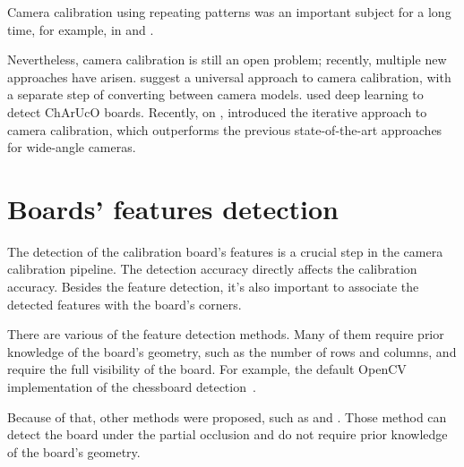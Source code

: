 Camera calibration using repeating patterns was an important subject for a long
time, for example, \cite{schaffalitzkyGeometricGroupingRepeated1998} in
\citeyear{schaffalitzkyGeometricGroupingRepeated1998} and
\cite{zhangFlexibleNewTechnique2000}.


Nevertheless, camera calibration is still an open problem; recently,
multiple new approaches have arisen.
\cite{lochmanBabelCalibUniversalApproach2021} suggest a universal approach
to camera calibration, with a separate step of converting between camera models.
\cite{huDeepChArUcoDark2019} used deep learning to detect ChArUcO boards.
Recently, on ,
\cite{duisterhofTartanCalibIterativeWideAngle2022} introduced the iterative
approach to camera calibration, which outperforms the previous state-of-the-art
approaches for wide-angle cameras.



\section{Boards' features detection}\label{sec:boards_features_detection}

The detection of the calibration board's features is a crucial step in the
camera calibration pipeline. The detection accuracy directly affects the
calibration accuracy. Besides the feature detection, it's also important to
associate the detected features with the board's corners.

There are various of the feature detection methods. Many of them require
prior knowledge of the board's geometry, such as the number of rows and columns,
and require the full visibility of the board. For example, the default OpenCV
implementation of the chessboard detection~\citep{OpenCVCameraCalibration}.

Because of that, other methods were proposed, such as
\cite{fuersattelOCPADOccludedCheckerboard2016} and
\cite{geigerAutomaticCameraRange2012}. Those method can detect the board under
the partial occlusion and do not require prior knowledge of the board's geometry.


